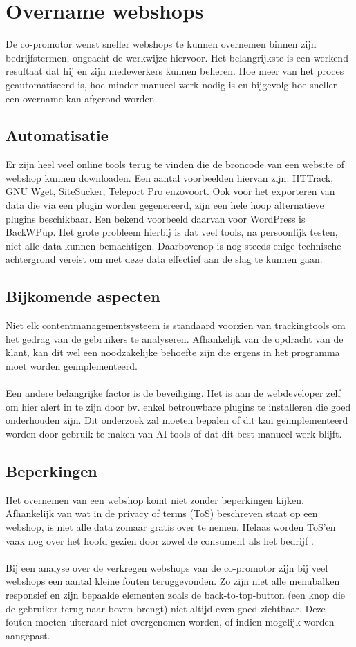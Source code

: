 \section{Overname webshops}
De co-promotor wenst sneller webshops te kunnen overnemen binnen zijn bedrijfstermen, ongeacht de werkwijze hiervoor. Het belangrijkste is een werkend resultaat dat hij en zijn medewerkers kunnen beheren. Hoe meer van het proces geautomatiseerd is, hoe minder manueel werk nodig is en bijgevolg hoe sneller een overname kan afgerond worden.
\subsection{Automatisatie}
Er zijn heel veel online tools terug te vinden die de broncode van een website of webshop kunnen downloaden. Een aantal voorbeelden hiervan zijn: HTTrack, GNU Wget, SiteSucker, Teleport Pro enzovoort. Ook voor het exporteren van data die via een plugin worden gegenereerd, zijn een hele hoop alternatieve plugins beschikbaar. Een bekend voorbeeld daarvan voor WordPress is BackWPup. Het grote probleem hierbij is dat veel tools, na persoonlijk testen, niet alle data kunnen bemachtigen. Daarbovenop is nog steeds enige technische achtergrond vereist om met deze data effectief aan de slag te kunnen gaan.  
\subsection{Bijkomende aspecten}
Niet elk contentmanagementsysteem is standaard voorzien van trackingtools om het gedrag van de gebruikers te analyseren. Afhankelijk van de opdracht van de klant, kan dit wel een noodzakelijke behoefte zijn die ergens in het programma moet worden geïmplementeerd. \autocite{DeBruijn2013}
\\\\
Een andere belangrijke factor is de beveiliging. Het is aan de webdeveloper zelf om hier alert in te zijn door bv. enkel betrouwbare plugins te installeren die goed onderhouden zijn. Dit onderzoek zal moeten bepalen of dit kan geïmplementeerd worden door gebruik te maken van AI-tools of dat dit best manueel werk blijft. \autocite{Bottelbergs2013}   
\subsection{Beperkingen}
Het overnemen van een webshop komt niet zonder beperkingen kijken. Afhankelijk van wat in de privacy of terms (ToS) beschreven staat op een webshop, is niet alle data zomaar gratis over te nemen. Helaas worden ToS'en vaak nog over het hoofd gezien door zowel de consument als het bedrijf \autocite{Braun2019}.  
\\\\
Bij een analyse over de verkregen webshops van de co-promotor zijn bij veel webshops een aantal kleine fouten teruggevonden. Zo zijn niet alle menubalken responsief en zijn bepaalde elementen zoals de back-to-top-button (een knop die de gebruiker terug naar boven brengt) niet altijd even goed zichtbaar. Deze fouten moeten uiteraard niet overgenomen worden, of indien mogelijk worden aangepast.  

